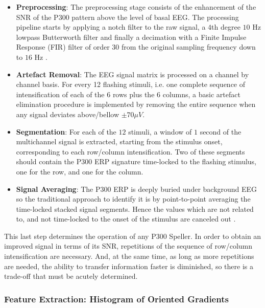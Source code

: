 \documentclass[entropy,article,submit,moreauthors,pdftex,10pt,a4paper]{mdpi}
\begin{document}
\begin{itemize}
\item \textbf{Preprocessing}: The preprocessing stage consists of the enhancement of the SNR of the P300 pattern above the level of basal EEG. The processing pipeline starts by applying a notch filter to the raw signal, a 
$4$th degree $10$ Hz lowpass Butterworth filter and finally a decimation with a Finite Impulse Response (FIR) filter of order $30$ from the original sampling frequency down to $16$ Hz \citep{Krusienski2006}.
\item \textbf{Artefact Removal}: The EEG signal matrix is processed on a channel by channel basis.   For every 12 flashing stimuli, i.e. one complete sequence of intensification of each of the $6$ rows plus the $6$ columns, a basic artefact elimination procedure is implemented by removing the entire sequence when any signal deviates above/bellow $ \pm 70 \mu V $.
\item \textbf{Segmentation}: For each of the $12$ stimuli,  a window of $1$ second of the multichannel signal is extracted, starting from the stimulus onset, corresponding to each row/column intensification.  Two of these segments should contain the P300 ERP signature time-locked to the flashing stimulus, one for the row, and one for the column.
\item \textbf{Signal Averaging}:  The P300 ERP is deeply buried under background EEG so the traditional approach to identify it is by point-to-point averaging the time-locked stacked signal segments.  Hence the values which are not related to, and not time-locked to the onset of the stimulus are canceled out \citep{Liang2008}. 
\end{itemize}

This last step determines the operation of any P300 Speller.  In order to obtain an improved signal in terms of its SNR, repetitions of the sequence of row/column intensification are necessary.  And, at the same time, as long as more repetitions are needed, the ability to transfer information faster is diminished, so there is a trade-off that must be acutely determined.

\subsubsection{Feature Extraction: Histogram of Oriented Gradients}
\label{SIFT}

\end{document}
